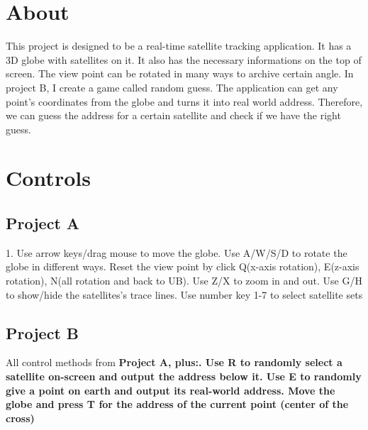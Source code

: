 \documentclass[letter]{article}
\begin{document}
\begin{flushleft}
\section{About}
This project is designed to be a real-time satellite tracking application. It has a 3D globe with satellites on it. It also has the necessary informations on the top of screen. The view point can be rotated in many ways to archive certain angle.\linebreak
\linebreak
In project B, I create a game called random guess. The application can get any point's coordinates from the globe and turns it into real world address. Therefore, we can guess the address for a certain satellite and check if we have the right guess.
\section{Controls}
\subsection{Project A}
1. Use arrow keys/drag mouse to move the globe. Use A/W/S/D to rotate the globe in different ways. Reset the view point by click Q(x-axis rotation), E(z-axis rotation), N(all rotation and back to UB). Use Z/X to zoom in and out. Use G/H to show/hide the satellites's trace lines. Use number key 1-7 to select satellite sets
\subsection{Project B}
All control methods from \bf Project A\rm, plus:. Use R to randomly select a satellite on-screen and output the address below it. Use E to randomly give a point on earth and output its real-world address. Move the globe and press T for the address of the current point (center of the cross)

\end{flushleft}
\end{document}
